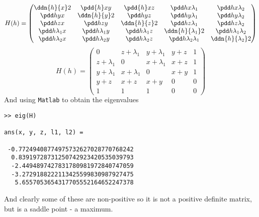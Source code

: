 \documentclass{X:/Documents/Coding/Latex/myassignment}
\begin{document}
\begin{enumerate}
	\[H(h) = \begin{pmatrix}
		\ddn {h}{x}2 & \pdd{h}xy & \pdd{h}xz & \pdd hx{\lambda_1} & \pdd hx{\lambda_2}\\
		\pdd hyx & \ddn {h}{y}2 & \pdd hyz & \pdd hy{\lambda_1} & \pdd hy{\lambda_2}\\  
		\pdd hzx & \pdd hzy &\ddn {h}{z}2 & \pdd hz{\lambda_1} & \pdd hz{\lambda_2}\\  
		\pdd h{\lambda_1}x & \pdd h{\lambda_1}y&\pdd h{\lambda_1}z &\ddn {h}{\lambda_1}2 & \pdd h{\lambda_1}{\lambda_2}\\
		\pdd h{\lambda_2}x & \pdd h{\lambda_2}y&\pdd h{\lambda_2}z &\pdd h{\lambda_2}{\lambda_1} &\ddn {h}{\lambda_2}2
	\end{pmatrix}\]
	\[H(h) = \begin{pmatrix}
		0 & z + \lambda_1 & y + \lambda_1 & y + z & 1\\
		z + \lambda_1 & 0 &x + \lambda_1 & x+z &1\\
		y + \lambda_1 & x + \lambda_1 & 0 & x+y & 1\\ 
		y + z & x + z & x + y & 0 & 0 \\
		1 & 1 & 1 &0 & 0 
	\end{pmatrix}\]
And using \verb|Matlab| to obtain the eigenvalues
\begin{lstlisting}
>> eig(H)
 
ans(x, y, z, l1, l2) =
 
 -0.77249408774975732627028770768242
  0.83919728731250742923420535039793
  -2.4494897427831780981972840747059
  -3.2729188222113425599830987927475
   5.6557053654317705552164652247378
\end{lstlisting}
And clearly some of these are non-positive so it is not a positive definite matrix, but is a saddle point - a maximum.







\end{enumerate}
\end{document}
